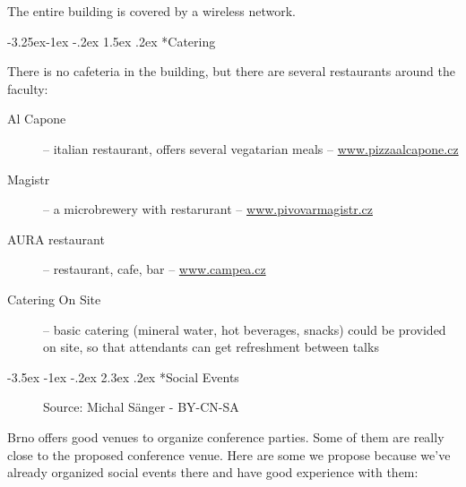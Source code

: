 \documentclass[10pt,a4paper]{article}
\makeatletter
\renewcommand\section{%
\@startsection{section}{1}{\z@}%
              {-3.5ex \@plus -1ex \@minus -.2ex}%
              {2.3ex \@plus.2ex}%
              {\color{kdelight}\sffamily\LARGE\bfseries}}
\renewcommand\subsection{%
\@startsection{subsection}{2}{\z@}%
              {-3.25ex\@plus -1ex \@minus -.2ex}%
              {1.5ex \@plus .2ex}%
              {\color{kdelight}\sffamily\Large\bfseries}}
\makeatother
\begin{document}
The entire building is covered by a wireless network.

\begin{figure}[ht]
\centering
\end{figure}



\subsection*{Catering}
There is no cafeteria in the building, but there are several restaurants around the faculty:

\begin{description}
\item[\color{kdedarker} Al Capone] -- italian restaurant, offers several vegatarian meals -- \sloppy \mbox{\url{www.pizzaalcapone.cz}}
\item[\color{kdedarker} Magistr] -- a microbrewery with restarurant -- \url{www.pivovarmagistr.cz}
\item[\color{kdedarker} AURA restaurant] -- restaurant, cafe, bar -- \url{www.campea.cz}
\item[\color{kdedarker} Catering On Site] -- basic catering (mineral water, hot
beverages, snacks) could be provided on site, so that attendants can get refreshment
between talks
\end{description}


\newpage

\section*{Social Events}

\begin{figure}
\vspace{-22pt}
\begin{center}
\footnotesize{Source: Michal Sänger - BY-CN-SA}
\vspace{-20pt}
\end{center}
\end{figure}

Brno offers good venues to organize conference parties. Some of them are
really close to the proposed conference venue. Here are some we propose
because we've already organized social events there and have good
experience with them:
\end{document}
